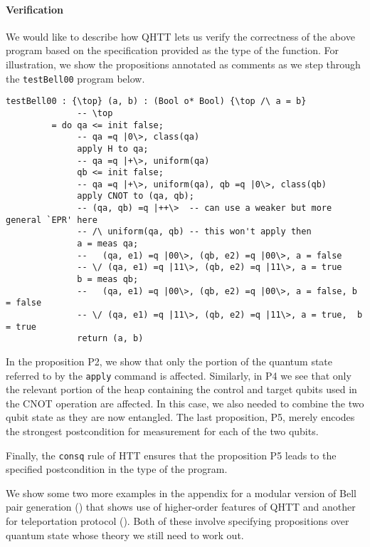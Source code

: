 \documentclass[acmsmall,nonacm,timestamp,review=false,anonymous=false]{acmart}
\begin{document}
\paragraph{Verification}
We would like to describe how QHTT lets us verify the correctness of the above program based on the specification provided as the type of the function. For illustration, we show the propositions annotated as comments as we step through the \texttt{testBell00} program below.
\newpage
\begin{lstlisting}[language=QHaskell]
testBell00 : {\top} (a, b) : (Bool o* Bool) {\top /\ a = b}
              -- \top
         = do qa <= init false;
              -- qa =q |0\>, class(qa)
              apply H to qa;
              -- qa =q |+\>, uniform(qa)
              qb <= init false;
              -- qa =q |+\>, uniform(qa), qb =q |0\>, class(qb)
              apply CNOT to (qa, qb);
              -- (qa, qb) =q |++\>  -- can use a weaker but more general `EPR' here
              -- /\ uniform(qa, qb) -- this won't apply then
              a = meas qa;
              --   (qa, e1) =q |00\>, (qb, e2) =q |00\>, a = false
              -- \/ (qa, e1) =q |11\>, (qb, e2) =q |11\>, a = true
              b = meas qb;
              --   (qa, e1) =q |00\>, (qb, e2) =q |00\>, a = false, b = false
              -- \/ (qa, e1) =q |11\>, (qb, e2) =q |11\>, a = true,  b = true
              return (a, b)
\end{lstlisting}

In the proposition P2, we show that only the portion of the quantum state referred to by the \texttt{apply} command is affected. Similarly, in P4 we see that only the relevant portion of the heap containing the control and target qubits used in the CNOT operation are affected. In this case, we also needed to combine the two qubit state as they are now entangled. The last proposition, P5, merely encodes the strongest postcondition for measurement for each of the two qubits.

Finally, the \texttt{consq} rule of HTT ensures that the proposition P5 leads to the specified postcondition in the type of the program.

We show some two more examples in the appendix for a modular version of Bell pair generation () that shows use of higher-order features of QHTT and another for teleportation protocol (). Both of these involve specifying propositions over quantum state whose theory we still need to work out.

\end{document}
